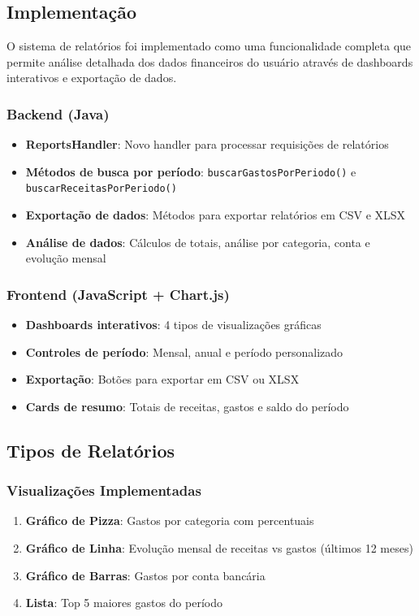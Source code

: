 \documentclass[12pt,a4paper]{article}
\begin{document}
\subsection{Implementação}

O sistema de relatórios foi implementado como uma funcionalidade completa que permite análise detalhada dos dados financeiros do usuário através de dashboards interativos e exportação de dados.

\subsubsection*{Backend (Java)}
\begin{itemize}
  \item \textbf{ReportsHandler}: Novo handler para processar requisições de relatórios
  \item \textbf{Métodos de busca por período}: \texttt{buscarGastosPorPeriodo()} e \texttt{buscarReceitasPorPeriodo()}
  \item \textbf{Exportação de dados}: Métodos para exportar relatórios em CSV e XLSX
  \item \textbf{Análise de dados}: Cálculos de totais, análise por categoria, conta e evolução mensal
\end{itemize}

\subsubsection*{Frontend (JavaScript + Chart.js)}
\begin{itemize}
  \item \textbf{Dashboards interativos}: 4 tipos de visualizações gráficas
  \item \textbf{Controles de período}: Mensal, anual e período personalizado
  \item \textbf{Exportação}: Botões para exportar em CSV ou XLSX
  \item \textbf{Cards de resumo}: Totais de receitas, gastos e saldo do período
\end{itemize}

\subsection{Tipos de Relatórios}

\subsubsection*{Visualizações Implementadas}
\begin{enumerate}
  \item \textbf{Gráfico de Pizza}: Gastos por categoria com percentuais
  \item \textbf{Gráfico de Linha}: Evolução mensal de receitas vs gastos (últimos 12 meses)
  \item \textbf{Gráfico de Barras}: Gastos por conta bancária
  \item \textbf{Lista}: Top 5 maiores gastos do período
\end{enumerate}
\end{document}
